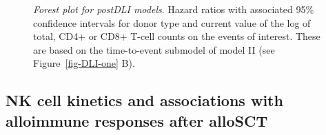 \documentclass[
  letterpaper,
  DIV=11,
  numbers=noendperiod]{scrreprt}
\begin{document}
\begin{figure}


\caption{\label{fig-DLI-six}\emph{Forest plot for postDLI models}.
Hazard ratios with associated 95\% confidence intervals for donor type
and current value of the log of total, CD4+ or CD8+ T-cell counts on the
events of interest. These are based on the time-to-event submodel of
model II (see Figure~\ref{fig-DLI-one} B).}

\end{figure}%

\subsection{NK cell kinetics and associations with alloimmune responses
after
alloSCT}\label{nk-cell-kinetics-and-associations-with-alloimmune-responses-after-allosct}
\end{document}
